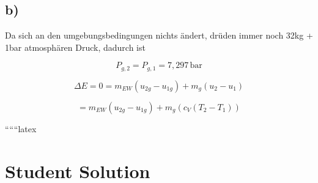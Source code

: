 

\subsection*{b)}

Da sich an den umgebungsbedingungen nichts ändert, drüden immer noch 32kg + 1bar atmosphären Druck, dadurch ist

\[
P_{g,2} = P_{g,1} = 7,297 \, \text{bar}
\]

\[
\Delta E = 0 = m_{EW} (u_{2g} - u_{1g}) + m_g (u_2 - u_1)
\]

\[
= m_{EW} (u_{2g} - u_{1g}) + m_g (c_V (T_2 - T_1))
\]

``````latex


\section*{Student Solution}
